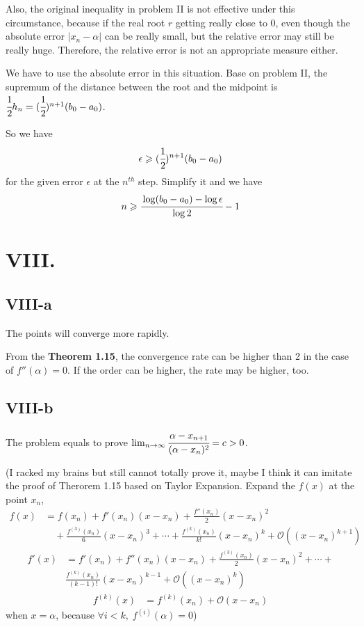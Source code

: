 \documentclass[a4paper]{article}
\begin{document}
Also, the original inequality in problem II is not effective under this circumstance, because if the real root $r$ getting really close to $0$,
even though the absolute error $|x_n - \alpha|$ can be really small, but the relative error may still be really huge. Therefore, the relative error is not an appropriate measure either.

We have to use the absolute error in this situation. Base on problem II, the supremum of the distance between the root and the midpoint is $\cfrac{1}{2}h_{n} = (\cfrac{1}{2})^{n+1}(b_0 - a_0)$.

So we have 
\[
\epsilon \geqslant (\cfrac{1}{2})^{n+1}(b_0 - a_0)
\]
for the given error $\epsilon$ at the $n^{th}$ step.
Simplify it and we have
\[
n \geqslant \cfrac{\log (b_0-a_0) - \log \epsilon}{\log 2} - 1
\]

\section*{VIII.}
\subsection*{VIII-a}
The points will converge more rapidly.

From the \textbf{Theorem 1.15}, the convergence rate can be higher than 2 in the case of $f''(\alpha) = 0$.
If the order can be higher, the rate may be higher, too.

\subsection*{VIII-b}
The problem equals to prove $\lim_{n \rightarrow \infty} \cfrac{\alpha - x_{n+1}}{(\alpha - x_n)^2} = c > 0$.

(I racked my brains but still cannot totally prove it, maybe I think it can imitate the proof of Therorem 1.15 based on Taylor Expansion.
Expand the $f(x)$ at the point $x_n$, 
\begin{align*}
f(x) &= f(x_n) + f'(x_n)(x - x_n) + \frac{f''(x_n)}{2}(x - x_n)^2 \\
&\quad + \frac{f^{(3)}(x_n)}{6}(x - x_n)^3 + \cdots + \frac{f^{(k)}(x_n)}{k!}(x - x_n)^k + \mathcal{O}((x - x_n)^{k+1})
\end{align*}
\begin{align*}
f'(x) &= f'(x_n) + f''(x_n)(x - x_n) + \frac{f^{(3)}(x_n)}{2}(x - x_n)^2 + \cdots + \\
&\frac{f^{(k)}(x_n)}{(k-1)!}(x - x_n)^{k-1} + \mathcal{O}((x - x_n)^{k})
\end{align*}
\begin{align*}
f^{(k)}(x) &= f^{(k)}(x_n) + \mathcal{O}(x - x_n)
\end{align*}
when $x = \alpha$, because $\forall i<k,\; f^{(i)}(\alpha)=0$)


\printbibliography
\end{document}
